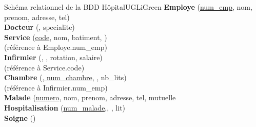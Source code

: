 \documentclass[a4paper,10pt,eval]{nsi}
\begin{document}
\pagestyle{empty}
\begin{encadrecolore}{Schéma relationnel de la BDD Hôpital}{UGLiGreen}
	\large
{\textbf{Employe} (\underline{num\_emp}, nom, prenom, adresse, tel)}\\

{\textbf{Docteur} (, specialite)}\\

{\textbf{Service}	(\uline{code}, nom, batiment, )}\\
(référence à {Employe.num\_emp})\\

{\textbf{Infirmier} (, , rotation, salaire)}\\
(référence à {Service.code})\\

{\textbf{Chambre}	(\uline{, num\_chambre}, , nb\_lits)}\\
(référence à {Infirmier.num\_emp})\\


{\textbf{Malade} (\underline{numero}, nom, prenom, adresse, tel, mutuelle}\\

{\textbf{Hospitalisation} (\underline{num\_malade},, , lit)}\\

{\textbf{Soigne} ()}\\

\end{encadrecolore}
\small
\end{document}
